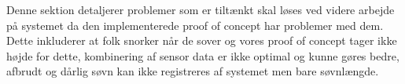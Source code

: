 Denne sektion detaljerer problemer som er tiltænkt skal løses ved videre arbejde på systemet da den implementerede proof of concept har problemer med dem. 
Dette inkluderer at folk snorker når de sover og vores proof of concept tager ikke højde for dette, kombinering af sensor data er ikke optimal og kunne gøres bedre, afbrudt og dårlig søvn kan ikke registreres af systemet men bare søvnlængde. 